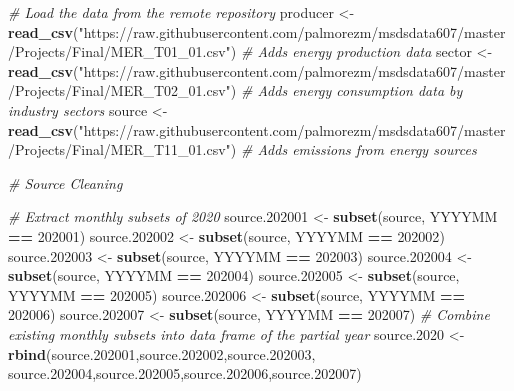 \documentclass[
]{article}
\newenvironment{Shaded}{\begin{snugshade}}{\end{snugshade}}
\newcommand{\CommentTok}[1]{\textcolor[rgb]{0.56,0.35,0.01}{\textit{#1}}}
\newcommand{\DecValTok}[1]{\textcolor[rgb]{0.00,0.00,0.81}{#1}}
\newcommand{\FloatTok}[1]{\textcolor[rgb]{0.00,0.00,0.81}{#1}}
\newcommand{\KeywordTok}[1]{\textcolor[rgb]{0.13,0.29,0.53}{\textbf{#1}}}
\newcommand{\NormalTok}[1]{#1}
\newcommand{\OperatorTok}[1]{\textcolor[rgb]{0.81,0.36,0.00}{\textbf{#1}}}
\newcommand{\StringTok}[1]{\textcolor[rgb]{0.31,0.60,0.02}{#1}}
\begin{document}
\begin{Shaded}
\begin{Highlighting}[]
\CommentTok{# Load the data from the remote repository}
\NormalTok{producer <-}\StringTok{ }\KeywordTok{read_csv}\NormalTok{(}\StringTok{"https://raw.githubusercontent.com/palmorezm/msdsdata607/master/Projects/Final/MER_T01_01.csv"}\NormalTok{) }
\CommentTok{# Adds energy production data}
\NormalTok{sector <-}\StringTok{ }\KeywordTok{read_csv}\NormalTok{(}\StringTok{"https://raw.githubusercontent.com/palmorezm/msdsdata607/master/Projects/Final/MER_T02_01.csv"}\NormalTok{) }
\CommentTok{# Adds energy consumption data by industry sectors}
\NormalTok{source <-}\StringTok{ }\KeywordTok{read_csv}\NormalTok{(}\StringTok{"https://raw.githubusercontent.com/palmorezm/msdsdata607/master/Projects/Final/MER_T11_01.csv"}\NormalTok{) }
\CommentTok{# Adds emissions from energy sources}


\CommentTok{# Source Cleaning}
    
    \CommentTok{# Extract monthly subsets of 2020}
\NormalTok{    source}\FloatTok{.202001}\NormalTok{ <-}\StringTok{ }\KeywordTok{subset}\NormalTok{(source, YYYYMM }\OperatorTok{==}\StringTok{ }\DecValTok{202001}\NormalTok{)}
\NormalTok{    source}\FloatTok{.202002}\NormalTok{ <-}\StringTok{ }\KeywordTok{subset}\NormalTok{(source, YYYYMM }\OperatorTok{==}\StringTok{ }\DecValTok{202002}\NormalTok{)}
\NormalTok{    source}\FloatTok{.202003}\NormalTok{ <-}\StringTok{ }\KeywordTok{subset}\NormalTok{(source, YYYYMM }\OperatorTok{==}\StringTok{ }\DecValTok{202003}\NormalTok{)}
\NormalTok{    source}\FloatTok{.202004}\NormalTok{ <-}\StringTok{ }\KeywordTok{subset}\NormalTok{(source, YYYYMM }\OperatorTok{==}\StringTok{ }\DecValTok{202004}\NormalTok{)}
\NormalTok{    source}\FloatTok{.202005}\NormalTok{ <-}\StringTok{ }\KeywordTok{subset}\NormalTok{(source, YYYYMM }\OperatorTok{==}\StringTok{ }\DecValTok{202005}\NormalTok{)}
\NormalTok{    source}\FloatTok{.202006}\NormalTok{ <-}\StringTok{ }\KeywordTok{subset}\NormalTok{(source, YYYYMM }\OperatorTok{==}\StringTok{ }\DecValTok{202006}\NormalTok{)}
\NormalTok{    source}\FloatTok{.202007}\NormalTok{ <-}\StringTok{ }\KeywordTok{subset}\NormalTok{(source, YYYYMM }\OperatorTok{==}\StringTok{ }\DecValTok{202007}\NormalTok{)}
    \CommentTok{# Combine existing monthly subsets into data frame of the partial year }
\NormalTok{    source}\FloatTok{.2020}\NormalTok{ <-}\StringTok{ }\KeywordTok{rbind}\NormalTok{(source}\FloatTok{.202001}\NormalTok{,source}\FloatTok{.202002}\NormalTok{,source}\FloatTok{.202003}\NormalTok{, source}\FloatTok{.202004}\NormalTok{,source}\FloatTok{.202005}\NormalTok{,source}\FloatTok{.202006}\NormalTok{,source}\FloatTok{.202007}\NormalTok{)}


\end{Highlighting}
\end{Shaded}
\end{document}
